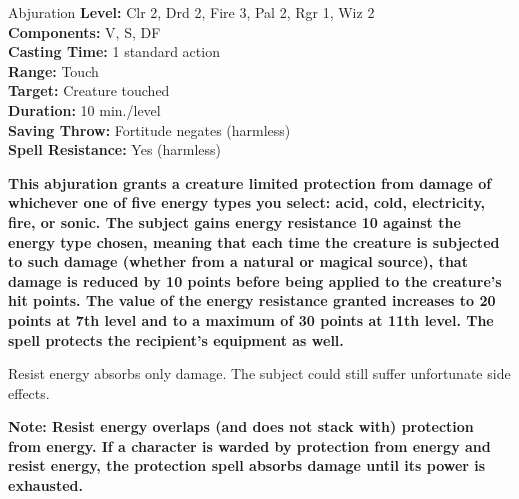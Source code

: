 {Abjuration}
{
	\textbf{Level:}
	Clr 2, Drd 2, Fire 3, Pal 2, Rgr 1, Wiz 2\\
	\textbf{Components:}
	V, S, DF\\
	\textbf{Casting Time:}
	1 standard action\\
	\textbf{Range:}
	Touch\\
	\textbf{Target:}
	Creature touched\\
	\textbf{Duration:}
	10 min./level\\
	\textbf{Saving Throw:}
	Fortitude negates (harmless)\\
	\textbf{Spell Resistance:}
	Yes (harmless)\\
}
{
	\textbf{	This abjuration grants a creature limited protection from damage of whichever one of five energy types you select: acid, cold, electricity, fire, or sonic. The subject gains energy resistance 10 against the energy type chosen, meaning that each time the creature is subjected to such damage (whether from a natural or magical source), that damage is reduced by 10 points before being applied to the creature's hit points. The value of the energy resistance granted increases to 20 points at 7th level and to a maximum of 30 points at 11th level. The spell protects the recipient's equipment as well.}

	Resist energy absorbs only damage. The subject could still suffer unfortunate side effects.

	\textbf{Note: Resist energy overlaps (and does not stack with) protection from energy. If a character is warded by protection from energy and resist energy, the protection spell absorbs damage until its power is exhausted.}

}
